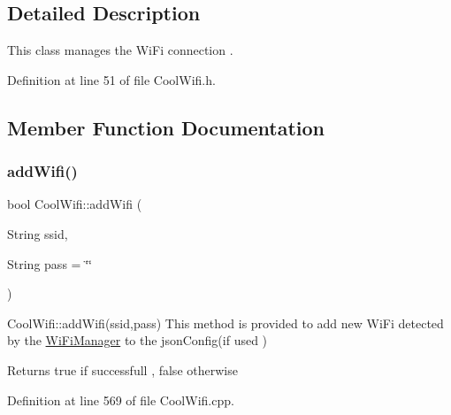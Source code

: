 \subsection{Detailed Description}
This class manages the Wi\+Fi connection . 

Definition at line 51 of file Cool\+Wifi.\+h.



\subsection{Member Function Documentation}
\mbox{\label{class_cool_wifi_a914d7a1df14dd6b75345fb614c34e9d6}} 
\subsubsection{\texorpdfstring{add\+Wifi()}{addWifi()}}
{\footnotesize\ttfamily bool Cool\+Wifi\+::add\+Wifi (\begin{DoxyParamCaption}\item[{String}]{ssid,  }\item[{String}]{pass = {\ttfamily \char`\"{}\char`\"{}} }\end{DoxyParamCaption})}

Cool\+Wifi\+::add\+Wifi(ssid,pass) This method is provided to add new Wi\+Fi detected by the \hyperlink{class_wi_fi_manager}{Wi\+Fi\+Manager} to the json\+Config(if used )

\begin{DoxyReturn}{Returns}
true if successfull , false otherwise 
\end{DoxyReturn}


Definition at line 569 of file Cool\+Wifi.\+cpp.


